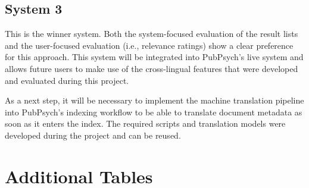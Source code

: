 \documentclass[a4paper,11pt]{article}
\begin{document}
\subsection{System 3}
This is the winner system. Both the system-focused evaluation of the result lists and the user-focused evaluation (i.e., relevance ratings) show a clear preference for this approach. This system will be integrated into PubPsych's live system and allows future users to make use of the cross-lingual features that were developed and evaluated during this project. 

As a next step, it will be necessary to implement the machine translation pipeline into PubPsych's indexing workflow to be able to translate document metadata as soon as it enters the index. The required scripts and translation models were developed during the project and can be reused. 













\newpage
\appendix
\section{Additional Tables}
\end{document}
